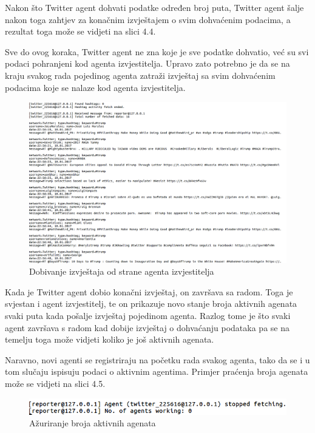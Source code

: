 \documentclass[a4paper,12pt]{foi}
\begin{document}
Nakon što Twitter agent dohvati podatke određen broj puta, Twitter agent šalje nakon toga zahtjev za konačnim izvještajem o svim dohvaćenim podacima, a rezultat toga može se vidjeti na slici 4.4. 

Sve do ovog koraka, Twitter agent ne zna koje je sve podatke dohvatio, već su svi podaci pohranjeni kod agenta izvjestitelja. Upravo zato potrebno je da se na kraju svakog rada pojedinog agenta zatraži izvještaj sa svim dohvaćenim podacima koje se nalaze kod agenta izvjestitelja.

\begin{figure}[h]
\includegraphics[width=\linewidth, frame]{04-getting-report}
	\caption{Dobivanje izvještaja od strane agenta izvjestitelja}
\end{figure}

Kada je Twitter agent dobio konačni izvještaj, on završava sa radom. Toga je svjestan i agent izvjestitelj, te on prikazuje novo stanje broja aktivnih agenata svaki puta kada pošalje izvještaj pojedinom agenta. Razlog tome je što svaki agent završava s radom kad dobije izvještaj o dohvaćanju podataka pa se na temelju toga može vidjeti koliko je još aktivnih agenata. 

Naravno, novi agenti se registriraju na početku rada svakog agenta, tako da se i u tom slučaju ispisuju podaci o aktivnim agentima. Primjer praćenja broja agenata može se vidjeti na slici 4.5.

\begin{figure}[h]
\includegraphics[width=\linewidth, frame]{05-agent-stopped}
	\caption{Ažuriranje broja aktivnih agenata}
\end{figure}
\end{document}
